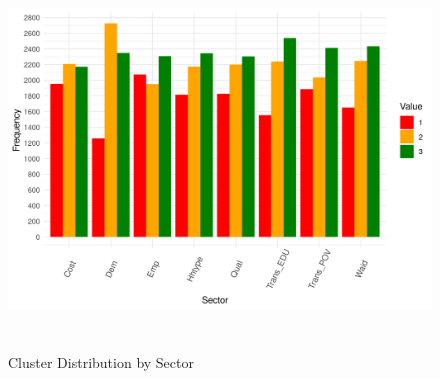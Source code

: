 \begin{figure}[htbp]
    \centering
     \includegraphics[width=1\textwidth, height=10cm]{plots/cluster_distribution.png}
     \caption{Cluster Distribution by Sector}
     \label{fig:cluster_dis}
 \end{figure}